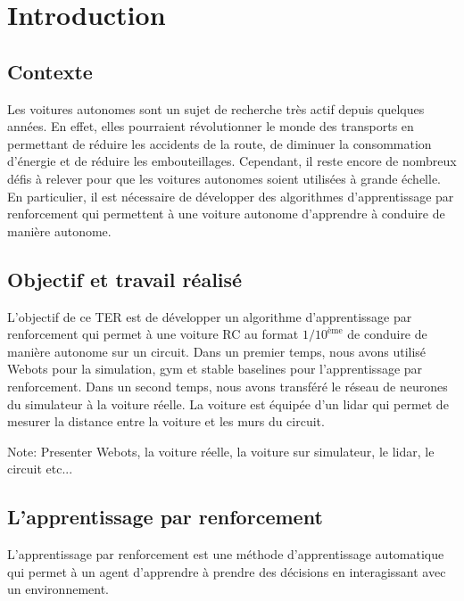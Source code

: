 \documentclass{article}
\begin{document}
\newpage

\tableofcontents

\newpage

\section{Introduction}

\subsection{Contexte}

Les voitures autonomes sont un sujet de recherche très actif depuis quelques années. 
En effet, elles pourraient révolutionner le monde des transports en permettant de réduire les accidents de la route, 
de diminuer la consommation d'énergie et de réduire les embouteillages. 
Cependant, il reste encore de nombreux défis à relever pour que les voitures autonomes soient utilisées à grande échelle.
En particulier, il est nécessaire de développer des algorithmes d'apprentissage par renforcement qui permettent à une 
voiture autonome d'apprendre à conduire de manière autonome.

\subsection{Objectif et travail réalisé}
L'objectif de ce TER est de développer un algorithme d'apprentissage par renforcement qui permet à une 
voiture RC au format $1/10^{\text{ème}}$ de conduire de manière autonome sur un circuit. Dans un premier temps, nous 
avons utilisé Webots pour la simulation, gym et stable baselines pour l'apprentissage par renforcement.
Dans un second temps, nous avons transféré le réseau de neurones du simulateur à la voiture réelle.
La voiture est équipée d'un lidar qui permet de mesurer la distance entre la voiture et les murs du circuit.

\vspace{0.5cm}
\noindent
Note: Presenter Webots, la voiture réelle, la voiture sur simulateur, le lidar, le circuit etc...


\subsection{L'apprentissage par renforcement}
L'apprentissage par renforcement est une méthode d'apprentissage automatique qui permet à un agent 
d'apprendre à prendre des décisions en interagissant avec un environnement. 
\end{document}
